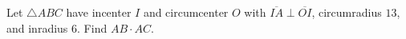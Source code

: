 Let $\triangle$$ABC$ have incenter $I$ and circumcenter $O$ with $\overline{IA} \perp \overline{OI}$, circumradius $13$, and inradius $6$. Find $AB \cdot AC$.
